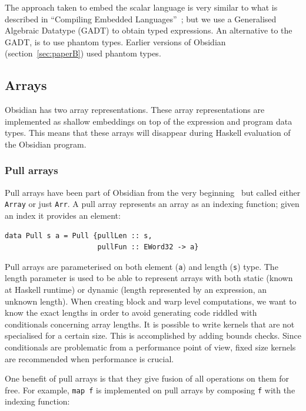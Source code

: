 \documentclass[a4paper]{book}
\begin{document}
The approach taken to embed the scalar language is very similar to what is described 
in ``Compiling Embedded Languages''~\citet{COMPILEEDSL}; but we use a Generalised Algebraic 
Datatype (GADT) to obtain typed expressions. An alternative to the GADT, is to use phantom 
types. Earlier versions of Obsidian (section~\ref{sec:paperB}) used phantom types. 


\subsection{Arrays} 

Obsidian has two array representations. These array representations are implemented as 
shallow embeddings on top of the expression and program data types. This means that these 
arrays will disappear during Haskell evaluation of the Obsidian program.
 
\subsubsection{Pull arrays}

Pull arrays have been part of Obsidian from the very beginning~\citet{JMT} but called either 
{\tt Array} or just {\tt Arr}. A pull array represents an array as an indexing function; given 
an index it provides an element: 

\begin{verbatim} 
data Pull s a = Pull {pullLen :: s, 
                      pullFun :: EWord32 -> a}
\end{verbatim} 

Pull arrays are parameterised on both element ({\tt a}) and length ({\tt s}) type. The length 
parameter is used to be able to represent arrays with both static (known at Haskell runtime) 
or dynamic (length represented by an expression, an unknown length). When creating block and 
warp level computations, we want to know the exact lengths in order to avoid generating code 
riddled with conditionals concerning array lengths. It is possible to write kernels that 
are not specialised for a certain size. This is accomplished by adding bounds checks. Since 
conditionals  are problematic from a performance point of view, fixed size kernels are recommended 
when performance is crucial. 

One benefit of pull arrays is that they give fusion of all operations on them for free. 
For example, {\tt map f} is implemented on pull arrays by composing {\tt f} with the indexing function: 
\end{document}
